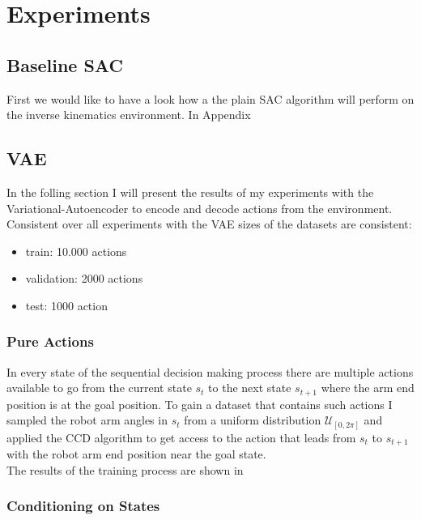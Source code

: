 \chapter{Experiments}\label{chap:experiments}

% 
% 



\section{Baseline SAC}

First we would like to have a look how a the plain SAC algorithm will perform on the inverse kinematics environment. In Appendix 




\section{VAE}

In the folling section I will present the results of my experiments with the Variational-Autoencoder to encode and decode actions from the environment.
Consistent over all experiments with the VAE sizes of the datasets are consistent:
\begin{itemize}
    \item train: 10.000 actions
    \item validation: 2000 actions
    \item test: 1000 action
\end{itemize}


\subsection{Pure Actions}

In every state of the sequential decision making process there are multiple actions available to go from the current state $s_t$ to the next state $s_{t+1}$ where the arm end position is at the goal position. To gain a dataset that contains such actions I sampled the robot arm angles in $s_t$ from a uniform distribution $\mathcal{U}_[0, 2\pi]$ and applied the CCD algorithm to get access to the action that leads from $s_t$ to $s_{t+1}$ with the robot arm end position near the goal state.\\

The results of the training process are shown in \figref{}

\subsection{Conditioning on States}

